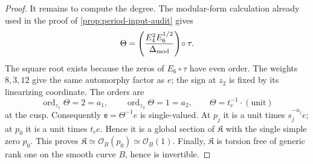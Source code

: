 \begin{proof}
It remains to compute the degree.  The modular-form calculation already
used in the proof of \cref{prop:period-input-audit} gives
\[
 \Theta=
 \left(\frac{E_4^2E_6^{1/2}}{\Delta_{\rm mod}}\right)\!\circ\tau.
\]
The square root exists because the zeros of \(E_6\circ\tau\) have even
order.  The weights \(8,3,12\) give the same automorphy factor as \(e\);
the sign at \(z_2\) is fixed by its linearizing coordinate.  The orders are
\[
 \operatorname{ord}_{z_1}\Theta=2=a_1,\qquad
 \operatorname{ord}_{z_2}\Theta=1=a_2,\qquad
 \Theta=t_c^{-1}\cdot(\text{unit})
\tag{9.6}
\]
at the cusp.  Consequently \(\mathsf e=\Theta^{-1}e\) is single-valued.
At \(p_j\) it is a unit times \(s_j^{-a_j}e\); at \(p_0\) it is a unit
times \(t_ce\).  Hence it is a global section of \(\mathfrak K\) with the
single simple zero \(p_0\).  This proves
\(\mathfrak K\simeq\mathcal O_B(p_0)\simeq\mathcal O_B(1)\).
Finally, \(\mathfrak K\) is torsion free of generic rank one on the smooth
curve \(B\), hence is invertible.
\end{proof}

